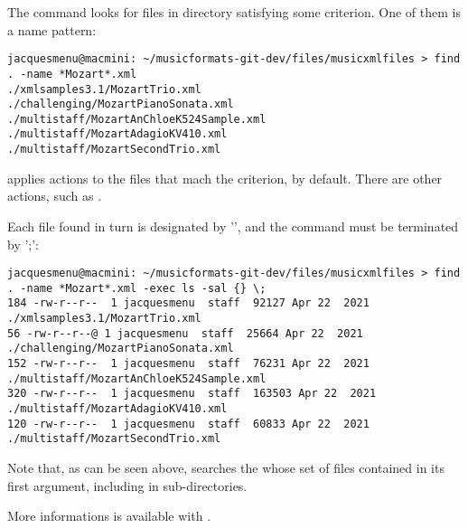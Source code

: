 The  command looks for files in directory satisfying some criterion. One of them is a name pattern:
\begin{lstlisting}[language=Terminal]
jacquesmenu@macmini: ~/musicformats-git-dev/files/musicxmlfiles > find . -name *Mozart*.xml
./xmlsamples3.1/MozartTrio.xml
./challenging/MozartPianoSonata.xml
./multistaff/MozartAnChloeK524Sample.xml
./multistaff/MozartAdagioKV410.xml
./multistaff/MozartSecondTrio.xml
\end{lstlisting}

 applies actions to the files that mach the criterion,  by default. There are other actions, such as . 

Each file found in turn is designated by '\code{\{\}}', and the command must be terminated by '\code{\textbackslash};':
\begin{lstlisting}[language=Terminal]
jacquesmenu@macmini: ~/musicformats-git-dev/files/musicxmlfiles > find . -name *Mozart*.xml -exec ls -sal {} \;
184 -rw-r--r--  1 jacquesmenu  staff  92127 Apr 22  2021 ./xmlsamples3.1/MozartTrio.xml
56 -rw-r--r--@ 1 jacquesmenu  staff  25664 Apr 22  2021 ./challenging/MozartPianoSonata.xml
152 -rw-r--r--  1 jacquesmenu  staff  76231 Apr 22  2021 ./multistaff/MozartAnChloeK524Sample.xml
320 -rw-r--r--  1 jacquesmenu  staff  163503 Apr 22  2021 ./multistaff/MozartAdagioKV410.xml
120 -rw-r--r--  1 jacquesmenu  staff  60833 Apr 22  2021 ./multistaff/MozartSecondTrio.xml
\end{lstlisting}

Note that, as can be seen above,  searches the whose set of files contained in its first argument, including in sub-directories.

More informations is available with .
